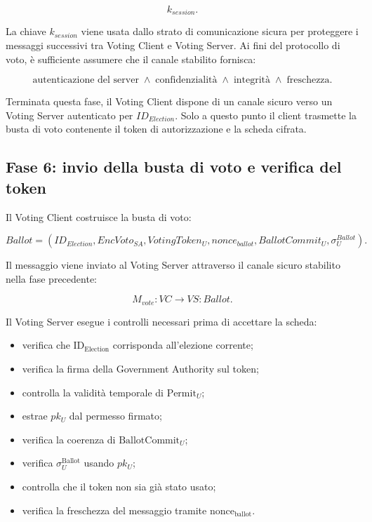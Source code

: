 \documentclass[a4paper,12pt]{article}
\begin{document}
\[
	k_{session}.
\]

La chiave \(k_{session}\) viene usata dallo strato di comunicazione sicura per proteggere i messaggi successivi tra Voting Client e Voting Server.
Ai fini del protocollo di voto, \`e sufficiente assumere che il canale stabilito fornisca:

\[
	\text{autenticazione del server} \;\land\;
	\text{confidenzialit\`a} \;\land\;
	\text{integrit\`a} \;\land\;
	\text{freschezza}.
\]


Terminata questa fase, il Voting Client dispone di un canale sicuro verso un Voting Server autenticato per \(ID_{Election}\).
Solo a questo punto il client trasmette la busta di voto contenente il token di autorizzazione e la scheda cifrata.

\subsection{Fase 6: invio della busta di voto e verifica del token}

Il Voting Client costruisce la busta di voto:

\[
	Ballot =
	(ID_{Election}, EncVoto_{SA}, VotingToken_U, nonce_{ballot}, BallotCommit_U, \sigma_U^{Ballot}).
\]

Il messaggio viene inviato al Voting Server attraverso il canale sicuro stabilito nella fase precedente:

\[
	M_{vote} : VC \rightarrow VS : Ballot.
\]

Il Voting Server esegue i controlli necessari prima di accettare la scheda:

\begin{itemize}
    \item verifica che \(\text{ID}_{\text{Election}}\) corrisponda all'elezione corrente;
    \item verifica la firma della Government Authority sul token;
    \item controlla la validità temporale di \(\text{Permit}_U\);
    \item estrae \(pk_U\) dal permesso firmato;
    \item verifica la coerenza di \(\text{BallotCommit}_U\);
    \item verifica \(\sigma_U^{\text{Ballot}}\) usando \(pk_U\);
    \item controlla che il token non sia già stato usato;
    \item verifica la freschezza del messaggio tramite \(\text{nonce}_{\text{ballot}}\).
\end{itemize}
\end{document}
